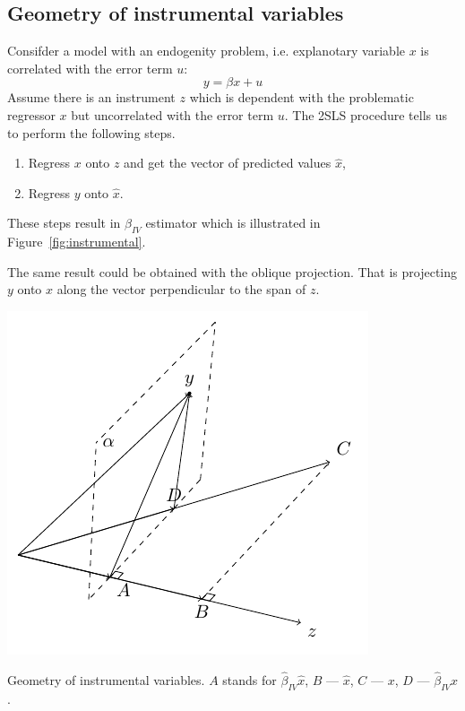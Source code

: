 \subsection{Geometry of instrumental variables}

Consifder a model with an endogenity problem, i.e. explanotary variable $x$
is correlated with the error term $u$:
\[
y = \beta x + u
\]
Assume there is an instrument $z$ which is dependent with the problematic regressor $x$
but uncorrelated with the error term $u$.
The 2SLS procedure tells us to perform the following steps.
\begin{enumerate}
  \item Regress $x$ onto $z$ and get the vector of predicted values $\hat x$,
  \item Regress $y$ onto $\hat x$.
\end{enumerate}
These steps result in $\beta_{IV}$ estimator which is illustrated in Figure~\ref{fig:instrumental}.

The same result could be obtained with the oblique projection.
That is projecting $y$ onto $x$ along the vector perpendicular to the span of $z$.

\begin{marginfigure}
\includegraphics[scale=0.85]{figures/02_instr.pdf}
\caption{Geometry of instrumental variables. $A$ stands for $\hat \beta_{IV} \hat x$,
$B$ — $\hat x$, $C$ — $x$, $D$ — $\hat \beta_{IV} x$.}
\label{fig:instrumental}
\end{marginfigure}

